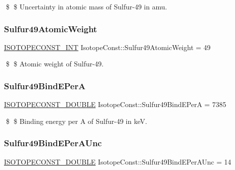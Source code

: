 \$ \$ Uncertainty in atomic mass of Sulfur-\/49 in amu. \mbox{\label{group___isotope_const-_sulfur-_s49_ga9646daeb6f7a2502798435c258e75779}} 
\subsubsection{\texorpdfstring{Sulfur49\+Atomic\+Weight}{Sulfur49AtomicWeight}}
{\footnotesize\ttfamily \mbox{\hyperlink{group___isotope_const-_macros_ga5f18360b3e99483a35c32d789e62621c}{I\+S\+O\+T\+O\+P\+E\+C\+O\+N\+S\+T\+\_\+\+I\+NT}} Isotope\+Const\+::\+Sulfur49\+Atomic\+Weight = 49}

\$ \$ Atomic weight of Sulfur-\/49. \mbox{\label{group___isotope_const-_sulfur-_s49_gaa0f19a58a7fa3b89f318edcf65d5c662}} 
\subsubsection{\texorpdfstring{Sulfur49\+Bind\+E\+PerA}{Sulfur49BindEPerA}}
{\footnotesize\ttfamily \mbox{\hyperlink{group___isotope_const-_macros_ga8f45a7272ce02c0b4c65c44636ed719a}{I\+S\+O\+T\+O\+P\+E\+C\+O\+N\+S\+T\+\_\+\+D\+O\+U\+B\+LE}} Isotope\+Const\+::\+Sulfur49\+Bind\+E\+PerA = 7385}

\$ \$ Binding energy per A of Sulfur-\/49 in keV. \mbox{\label{group___isotope_const-_sulfur-_s49_gad12f08e99d6f31424652cecd5951838c}} 
\subsubsection{\texorpdfstring{Sulfur49\+Bind\+E\+Per\+A\+Unc}{Sulfur49BindEPerAUnc}}
{\footnotesize\ttfamily \mbox{\hyperlink{group___isotope_const-_macros_ga8f45a7272ce02c0b4c65c44636ed719a}{I\+S\+O\+T\+O\+P\+E\+C\+O\+N\+S\+T\+\_\+\+D\+O\+U\+B\+LE}} Isotope\+Const\+::\+Sulfur49\+Bind\+E\+Per\+A\+Unc = 14}

